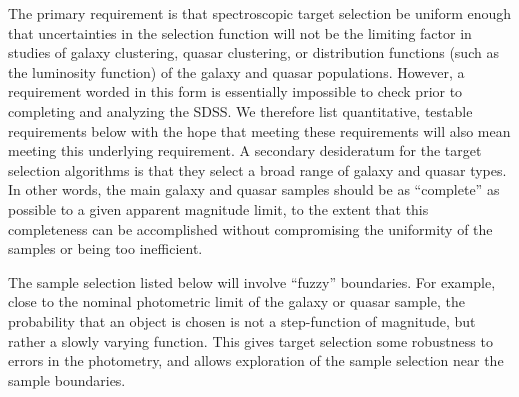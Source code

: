 The primary requirement is that spectroscopic target selection be
uniform enough that uncertainties in the selection function will
not be the limiting factor in studies of galaxy clustering,
quasar clustering, or distribution functions (such as the luminosity
function) of the galaxy and quasar populations.  However, a
requirement worded in this form is essentially impossible to
check prior to completing and analyzing the SDSS.  We therefore
list quantitative, testable requirements below with the hope
that meeting these requirements will also mean meeting this
underlying requirement.  A secondary desideratum for the target
selection algorithms is that they select a broad range of galaxy
and quasar types. In other words, the main galaxy and quasar
samples should be as ``complete'' as possible to a given apparent
magnitude limit, to the extent that this completeness can be
accomplished without compromising the uniformity of the samples
or being too inefficient. 

The sample selection listed below will involve ``fuzzy'' boundaries.
For example, close to the nominal photometric limit of the galaxy or
quasar sample, the probability that an object is chosen is not a
step-function of magnitude, but rather a slowly varying function.
This gives target selection some robustness to errors in the
photometry, and allows exploration of the sample selection near the
sample boundaries. 


